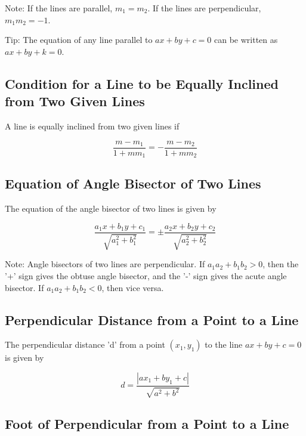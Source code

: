 \documentclass{article}
\begin{document}
Note: If the lines are parallel, \(m_1 = m_2\). If the lines are perpendicular, \(m_1 m_2 = -1\).

Tip: The equation of any line parallel to \(ax + by + c = 0\) can be written as \(ax + by + k = 0\).

\subsection{Condition for a Line to be Equally Inclined from Two Given Lines}

A line is equally inclined from two given lines if

\begin{equation}
\frac{m - m_1}{1 + m m_1} = -\frac{m - m_2}{1 + m m_2}
\end{equation}

\subsection{Equation of Angle Bisector of Two Lines}

The equation of the angle bisector of two lines is given by

\begin{equation}
\frac{a_1 x + b_1 y + c_1}{\sqrt{a_1^2 + b_1^2}} = \pm \frac{a_2 x + b_2 y + c_2}{\sqrt{a_2^2 + b_2^2}}
\end{equation}

Note: Angle bisectors of two lines are perpendicular. If \(a_1 a_2 + b_1 b_2 > 0\), then the '+' sign gives the obtuse angle bisector, and the '-' sign gives the acute angle bisector. If \(a_1 a_2 + b_1 b_2 < 0\), then vice versa.

\subsection{Perpendicular Distance from a Point to a Line}

The perpendicular distance 'd' from a point \((x_1, y_1)\) to the line \(ax + by + c = 0\) is given by

\begin{equation}
d = \frac{|ax_1 + by_1 + c|}{\sqrt{a^2 + b^2}}
\end{equation}

\subsection{Foot of Perpendicular from a Point to a Line}
\end{document}
